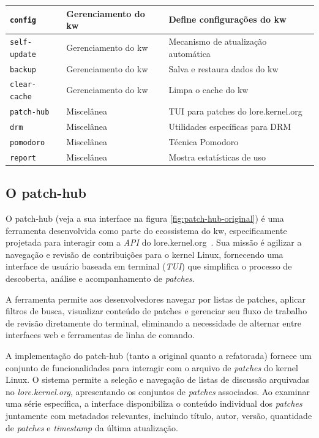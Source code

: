\begin{table}[ht]
\begin{center}
\begin{tabular}{|p{}|p{}|p{}|}
        \texttt{config}    & Gerenciamento do kw    & Define configurações do kw \\\hline
        \texttt{self-update}    & Gerenciamento do kw    & Mecanismo de atualização automática \\\hline
        \texttt{backup}    & Gerenciamento do kw    & Salva e restaura dados do kw \\\hline
        \texttt{clear-cache}    & Gerenciamento do kw    & Limpa o cache do kw \\\hline
        \texttt{patch-hub}    & Miscelânea    & TUI para patches do lore.kernel.org \\\hline
        \texttt{drm}    & Miscelânea    & Utilidades específicas para DRM \\\hline
        \texttt{pomodoro}    & Miscelânea    & Técnica Pomodoro \\\hline
        \texttt{report}    & Miscelânea    & Mostra estatísticas de uso \\\hline
    \end{tabular}
    \end{center}
\end{table}

\subsection{O patch-hub}

O patch-hub (veja a sua interface na figura \ref{fig:patch-hub-original}) é uma ferramenta desenvolvida como parte do ecossistema do kw, especificamente projetada para interagir com a \emph{API} do lore.kernel.org~\citep{patch_hub_github}. Sua missão é agilizar a navegação e revisão de contribuições para o kernel Linux, fornecendo uma interface de usuário baseada em terminal (\emph{TUI}) que simplifica o processo de descoberta, análise e acompanhamento de \emph{patches}.

A ferramenta permite aos desenvolvedores navegar por listas de patches, aplicar filtros de busca, visualizar conteúdo de patches e gerenciar seu fluxo de trabalho de revisão diretamente do terminal, eliminando a necessidade de alternar entre interfaces web e ferramentas de linha de comando.

A implementação do patch-hub (tanto a original quanto a refatorada) fornece um conjunto de funcionalidades para interagir com o arquivo de \emph{patches} do kernel Linux. O sistema permite a seleção e navegação de listas de discussão arquivadas no \textit{lore.kernel.org}, apresentando os conjuntos de \emph{patches} associados. Ao examinar uma série específica, a interface disponibiliza o conteúdo individual dos \emph{patches} juntamente com metadados relevantes, incluindo título, autor, versão, quantidade de \emph{patches} e \emph{timestamp} da última atualização.

